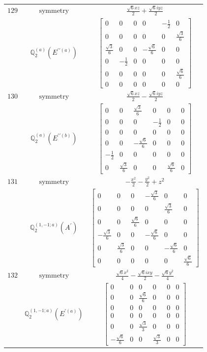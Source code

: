 \documentclass[fleqn,8pt,landscape]{jsarticle}
\begin{document}
\begin{longtable}{ccc}
$ 129 $ & $ \text{symmetry} $ & $ \frac{\sqrt{6} x z}{2} + \frac{\sqrt{6} i y z}{2} $ \\
$  $ & $ \mathbb{Q}_{2}^{(a)}(E^{\prime\prime(a)}) $ & $ \begin{bmatrix} 0 & 0 & 0 & 0 & - \frac{1}{2} & 0 \\ 0 & 0 & 0 & 0 & 0 & \frac{\sqrt{3}}{6} \\ \frac{\sqrt{3}}{6} & 0 & 0 & - \frac{\sqrt{6}}{6} & 0 & 0 \\ 0 & - \frac{1}{2} & 0 & 0 & 0 & 0 \\ 0 & 0 & 0 & 0 & 0 & \frac{\sqrt{6}}{6} \\ 0 & 0 & 0 & 0 & 0 & 0 \end{bmatrix} $ \\ \hline
$ 130 $ & $ \text{symmetry} $ & $ \frac{\sqrt{6} x z}{2} - \frac{\sqrt{6} i y z}{2} $ \\
$  $ & $ \mathbb{Q}_{2}^{(a)}(E^{\prime\prime(b)}) $ & $ \begin{bmatrix} 0 & 0 & \frac{\sqrt{3}}{6} & 0 & 0 & 0 \\ 0 & 0 & 0 & - \frac{1}{2} & 0 & 0 \\ 0 & 0 & 0 & 0 & 0 & 0 \\ 0 & 0 & - \frac{\sqrt{6}}{6} & 0 & 0 & 0 \\ - \frac{1}{2} & 0 & 0 & 0 & 0 & 0 \\ 0 & \frac{\sqrt{3}}{6} & 0 & 0 & \frac{\sqrt{6}}{6} & 0 \end{bmatrix} $ \\ \hline
$ 131 $ & $ \text{symmetry} $ & $ - \frac{x^{2}}{2} - \frac{y^{2}}{2} + z^{2} $ \\
$  $ & $ \mathbb{Q}_{2}^{(1,-1;a)}(A^{\prime}) $ & $ \begin{bmatrix} 0 & 0 & 0 & - \frac{\sqrt{3}}{6} & 0 & 0 \\ 0 & 0 & 0 & 0 & \frac{\sqrt{3}}{6} & 0 \\ 0 & 0 & \frac{\sqrt{6}}{6} & 0 & 0 & 0 \\ - \frac{\sqrt{3}}{6} & 0 & 0 & - \frac{\sqrt{6}}{6} & 0 & 0 \\ 0 & \frac{\sqrt{3}}{6} & 0 & 0 & - \frac{\sqrt{6}}{6} & 0 \\ 0 & 0 & 0 & 0 & 0 & \frac{\sqrt{6}}{6} \end{bmatrix} $ \\ \hline
$ 132 $ & $ \text{symmetry} $ & $ \frac{\sqrt{6} x^{2}}{4} - \frac{\sqrt{6} i x y}{2} - \frac{\sqrt{6} y^{2}}{4} $ \\
$  $ & $ \mathbb{Q}_{2}^{(1,-1;a)}(E^{\prime(a)}) $ & $ \begin{bmatrix} 0 & 0 & 0 & 0 & 0 & 0 \\ 0 & 0 & \frac{\sqrt{6}}{6} & 0 & 0 & 0 \\ 0 & 0 & 0 & 0 & 0 & 0 \\ 0 & 0 & 0 & 0 & 0 & 0 \\ 0 & 0 & \frac{\sqrt{3}}{3} & 0 & 0 & 0 \\ - \frac{\sqrt{6}}{6} & 0 & 0 & \frac{\sqrt{3}}{3} & 0 & 0 \end{bmatrix} $ \\ \hline

\end{longtable}
\end{document}
